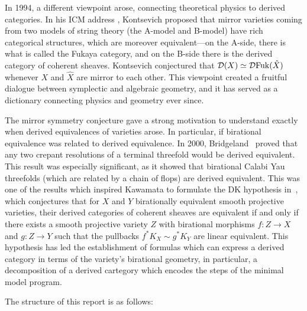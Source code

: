 In 1994, a different viewpoint arose, connecting theoretical physics to derived categories. In his ICM address \cite{kontsevich_homological_1994}, Kontsevich proposed that mirror varieties coming from two models of string theory (the A-model and B-model) have rich categorical structures, which are moreover equivalent---on the A-side, there is what is called the Fukaya category, and on the B-side there is the derived category of coherent sheaves. Kontsevich conjectured that $\mathcal{D}(X)\simeq \mathcal{D} \mathrm{Fuk}(\hat{X})$ whenever $X$ and $\hat{X}$ are mirror to each other. This viewpoint created a fruitful dialogue between symplectic and algebraic geometry, and it has served as a dictionary connecting physics and geometry ever since.

The mirror symmetry conjecture gave a strong motivation to understand exactly when derived equivalences of varieties arose. In particular, if birational equivalence was related to derived equivalence. In 2000, Bridgeland~\cite*{bridgeland_flops_2000} proved that any two crepant resolutions of a terminal threefold would be derived equivalent. This result was especially significant, as it showed that birational Calabi Yau threefolds (which are related by a chain of flops) are derived equivalent. This was one of the results which inspired Kawamata to formulate the DK hypothesis in~\cite*{kawamata_d-equivalence_2002}, which conjectures that for $X$ and $Y$ birationally equivalent smooth projective varieties, their derived categories of coherent sheaves are equivalent if and only if there exists a smooth projective variety $Z$ with birational morphisms $f: Z \to X$ and $g: Z\to Y$ such that the pullbacks $f^{*}K_{X}\sim g^{*}K_{Y}$ are linear equivalent. This hypothesis has led the establishment of formulas which can express a derived category in terms of the variety's birational geometry, in particular, a decomposition of a derived cartegory which encodes the steps of the minimal model program.  

The structure of this report is as follows: 

